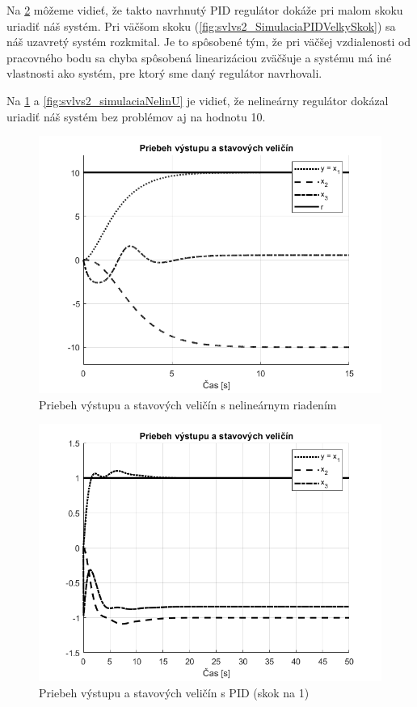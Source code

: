 \documentclass[../main.tex]{subfiles}
\begin{document}
Na \cref{fig:svlvs2_SimulaciaPID} môžeme vidieť, že takto navrhnutý PID regulátor dokáže pri malom skoku uriadiť náš systém. Pri väčšom skoku (\cref{fig:svlvs2_SimulaciaPIDVelkySkok}) sa náš uzavretý systém rozkmital. Je to spôsobené tým, že pri väčšej vzdialenosti od pracovného bodu sa chyba spôsobená linearizáciou zväčšuje a systému má iné vlastnosti ako systém, pre ktorý sme daný regulátor navrhovali.

Na \cref{fig:svlvs2_simulaciaNelin} a \cref{fig:svlvs2_simulaciaNelinU} je vidieť, že nelineárny regulátor dokázal uriadiť náš systém bez problémov aj na hodnotu 10.
	\begin{figure}[h!]
		\centering
		\includegraphics[width=0.8\linewidth]{SimulaciaNelin}
		\caption{Priebeh výstupu a stavových veličín s nelineárnym riadením}
		\label{fig:svlvs2_simulaciaNelin}
	\end{figure}

	\begin{figure}[h!]
		\centering
		\includegraphics[width=0.8\linewidth]{SimulaciaPID}
		\caption{Priebeh výstupu a stavových veličín s PID (skok na 1)}
		\label{fig:svlvs2_SimulaciaPID}
	\end{figure}
\end{document}
